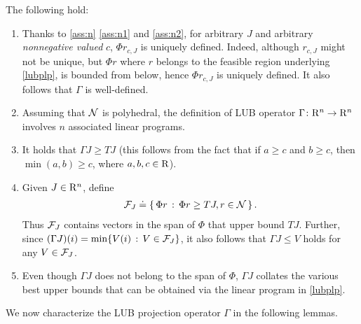\begin{remark}\label{lubremark}
The following hold: 
\begin{enumerate}
\item Thanks to \cref{ass:n} \eqref{ass:n1} and \eqref{ass:n2}, 
for arbitrary $J$ and arbitrary \emph{nonnegative valued} $c$,
 $\Phi r_{c,J}$ is uniquely defined.
Indeed, although $r_{c,J}$ might not be unique, but $\Phi r$ where $r$ belongs to the feasible
 region underlying \eqref{lubplp}, is bounded from below, hence  $\Phi r_{c,J}$ is uniquely defined.
It also follows that $\Gamma$ is well-defined.
\item Assuming that $\mathcal{N}$ is polyhedral, 
	the definition of LUB operator $\Gamma \colon \mathrm{R}^n \rightarrow \mathrm{R}^n$ involves $n$ associated linear programs.
\item It holds that $\Gamma J\geq TJ$ (this follows from the fact that if $a\geq c$ and $b\geq c$, then $\min(a,b)\geq c$, where $a, b, c \in \mathrm{R}$).
\item Given $J\in \mathrm{R}^n$, define 
\begin{align*}
\mathcal{F}_J\doteq\{\,\Phi r\,:\,\Phi r\geq TJ, r\in \mathcal{N}\,\}\,.
\end{align*}
Thus $\mathcal{F}_J$ contains vectors in the span of $\Phi$ that upper bound $TJ$. 
Further, since $(\Gamma J)(i) = \min\{ V(i) \,:\, V\in \mathcal{F}_J \}$, it also follows that $\Gamma J \le V$ holds for any $V\in \mathcal{F}_J$.
\item Even though $\Gamma J$ does not belong to the span of $\Phi$, $\Gamma J$ collates the various best upper bounds that can be obtained via the linear program in \eqref{lubplp}.
\begin{comment}
\item The LUB operator $\Gamma$ in \eqref{gamdef} bears close similarity to the ALP in \eqref{alp}.
In fact, it is not hard to observe that $(\Gamma J)(i) = (\Phi r_{e_i})(i)$ for any $1\le i \le n$; the reason $\Gamma$ is defined the way it is so that this resembles to \eqref{alp} will be clear. 
\end{comment}
\end{enumerate}
\end{remark}
We now characterize the LUB projection operator $\Gamma$ in the following lemmas. 
